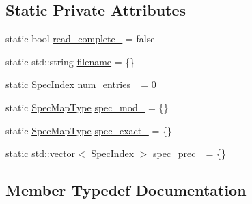 \subsection*{Static Private Attributes}
\begin{DoxyCompactItemize}
\item 
static bool \hyperlink{structvt_1_1vrt_1_1collection_1_1balance_1_1_read_l_b_spec_af5c8b5f02b64bb47b59351d6facf465e}{read\+\_\+complete\+\_\+} = false
\item 
static std\+::string \hyperlink{structvt_1_1vrt_1_1collection_1_1balance_1_1_read_l_b_spec_a51ddefee7236d3128e5d906675d5a74d}{filename} = \{\}
\item 
static \hyperlink{namespacevt_1_1vrt_1_1collection_1_1balance_a72a5e0d9936ddf57f8e6c64e0e9fd123}{Spec\+Index} \hyperlink{structvt_1_1vrt_1_1collection_1_1balance_1_1_read_l_b_spec_ae97cd7f00965a8360c64342c4b3ac941}{num\+\_\+entries\+\_\+} = 0
\item 
static \hyperlink{structvt_1_1vrt_1_1collection_1_1balance_1_1_read_l_b_spec_a6b1c83bd61c581d9605941e2381432b9}{Spec\+Map\+Type} \hyperlink{structvt_1_1vrt_1_1collection_1_1balance_1_1_read_l_b_spec_a72033347ba73a23dd3494ead118e44d1}{spec\+\_\+mod\+\_\+} = \{\}
\item 
static \hyperlink{structvt_1_1vrt_1_1collection_1_1balance_1_1_read_l_b_spec_a6b1c83bd61c581d9605941e2381432b9}{Spec\+Map\+Type} \hyperlink{structvt_1_1vrt_1_1collection_1_1balance_1_1_read_l_b_spec_a40226a2163e4cc03bc48f766df0bb78d}{spec\+\_\+exact\+\_\+} = \{\}
\item 
static std\+::vector$<$ \hyperlink{namespacevt_1_1vrt_1_1collection_1_1balance_a72a5e0d9936ddf57f8e6c64e0e9fd123}{Spec\+Index} $>$ \hyperlink{structvt_1_1vrt_1_1collection_1_1balance_1_1_read_l_b_spec_a53d7c8950db9d6b4d8b7d895d0a264d0}{spec\+\_\+prec\+\_\+} = \{\}
\end{DoxyCompactItemize}


\subsection{Member Typedef Documentation}
\mbox{\label{structvt_1_1vrt_1_1collection_1_1balance_1_1_read_l_b_spec_a01c2aa3a9e92be646c37f24afda6afa2}} 
